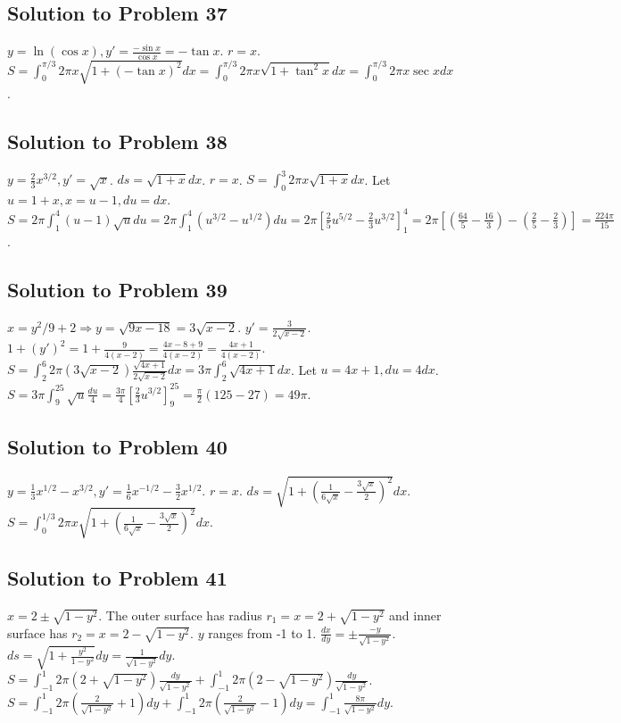 \documentclass[12pt]{article}
\begin{document}
\subsection*{Solution to Problem 37}
$y=\ln(\cos x), y'=\frac{-\sin x}{\cos x}=-\tan x$. $r=x$.
$S=\int_0^{\pi/3} 2\pi x \sqrt{1+(-\tan x)^2} dx = \int_0^{\pi/3} 2\pi x \sqrt{1+\tan^2 x} dx = \int_0^{\pi/3} 2\pi x \sec x dx$.

\subsection*{Solution to Problem 38}
$y=\frac{2}{3}x^{3/2}, y'=\sqrt{x}$. $ds=\sqrt{1+x}dx$. $r=x$.
$S=\int_0^3 2\pi x \sqrt{1+x}dx$. Let $u=1+x, x=u-1, du=dx$.
$S=2\pi\int_1^4 (u-1)\sqrt{u}du = 2\pi\int_1^4(u^{3/2}-u^{1/2})du=2\pi[\frac{2}{5}u^{5/2}-\frac{2}{3}u^{3/2}]_1^4 = 2\pi[(\frac{64}{5}-\frac{16}{3})-(\frac{2}{5}-\frac{2}{3})] = \frac{224\pi}{15}$.

\subsection*{Solution to Problem 39}
$x = y^2/9+2 \Rightarrow y=\sqrt{9x-18}=3\sqrt{x-2}$. $y'=\frac{3}{2\sqrt{x-2}}$. $1+(y')^2=1+\frac{9}{4(x-2)}=\frac{4x-8+9}{4(x-2)}=\frac{4x+1}{4(x-2)}$.
$S=\int_2^6 2\pi (3\sqrt{x-2})\frac{\sqrt{4x+1}}{2\sqrt{x-2}}dx = 3\pi\int_2^6 \sqrt{4x+1}dx$.
Let $u=4x+1, du=4dx$. $S=3\pi\int_9^{25} \sqrt{u}\frac{du}{4} = \frac{3\pi}{4}[\frac{2}{3}u^{3/2}]_9^{25} = \frac{\pi}{2}(125-27)=49\pi$.

\subsection*{Solution to Problem 40}
$y = \frac{1}{3}x^{1/2} - x^{3/2}, y'=\frac{1}{6}x^{-1/2}-\frac{3}{2}x^{1/2}$. $r=x$.
$ds=\sqrt{1+(\frac{1}{6\sqrt{x}}-\frac{3\sqrt{x}}{2})^2}dx$.
$S=\int_0^{1/3} 2\pi x \sqrt{1+(\frac{1}{6\sqrt{x}}-\frac{3\sqrt{x}}{2})^2} dx$.

\subsection*{Solution to Problem 41}
$x=2\pm\sqrt{1-y^2}$. The outer surface has radius $r_1=x=2+\sqrt{1-y^2}$ and inner surface has $r_2=x=2-\sqrt{1-y^2}$. $y$ ranges from -1 to 1.
$\frac{dx}{dy}=\pm\frac{-y}{\sqrt{1-y^2}}$. $ds=\sqrt{1+\frac{y^2}{1-y^2}}dy = \frac{1}{\sqrt{1-y^2}}dy$.
$S = \int_{-1}^1 2\pi(2+\sqrt{1-y^2})\frac{dy}{\sqrt{1-y^2}} + \int_{-1}^1 2\pi(2-\sqrt{1-y^2})\frac{dy}{\sqrt{1-y^2}}$.
$S = \int_{-1}^1 2\pi(\frac{2}{\sqrt{1-y^2}}+1)dy + \int_{-1}^1 2\pi(\frac{2}{\sqrt{1-y^2}}-1)dy = \int_{-1}^1 \frac{8\pi}{\sqrt{1-y^2}}dy$.
\end{document}
